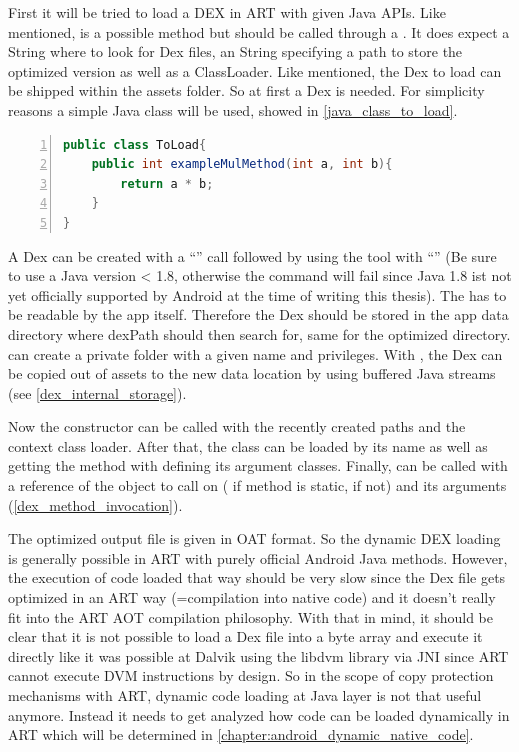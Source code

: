 First it will be tried to load a DEX in ART with given Java APIs.
Like mentioned,  is a possible method but should be called
through a . It does expect a  String where to look for Dex files, an  String specifying a path to store the optimized version as well as a  ClassLoader.
Like mentioned, the Dex to load can be shipped within the assets folder.
So at first a Dex is needed. For simplicity reasons a simple Java class will be used, showed in \autoref{java_class_to_load}.
\begin{lstlisting}[language=Java, caption=Java Class to load, label=java_class_to_load, numbers=left]
public class ToLoad{
    public int exampleMulMethod(int a, int b){
        return a * b;
    }
}
\end{lstlisting}
A Dex can be created with a ``'' call followed by
using the  tool with ``'' (Be sure to use a Java version < 1.8, otherwise the 
command will fail since Java 1.8 ist not yet officially supported by Android at the time
of writing this thesis).
The  has to be readable by the app itself. Therefore
the Dex should be stored in the app data directory where dexPath should then
search for, same for the optimized directory.
 can create a private folder with a given name
and privileges. With , the Dex can be
copied out of assets to the new data location by using buffered Java streams (see \autoref{dex_internal_storage}).

Now the  constructor can be called with the recently
created paths and the context class loader. After that, the class can be loaded
by its name as well as getting the method with defining its argument classes.
Finally,  can be called with a reference of the object to call
on ( if method is static,  if not) and its
arguments (\autoref{dex_method_invocation}).

The optimized output file is given in OAT format.
So the dynamic DEX loading is generally possible in ART with purely official
Android Java methods. However, the execution of code loaded that way should
be very slow since the Dex file gets optimized in an ART way (=compilation
into native code) and it doesn't really fit into the ART AOT compilation
philosophy. With that in mind, it should be clear that it is not possible
to load a Dex file into a byte array and execute it directly like it was
possible at Dalvik using the libdvm library via JNI since ART cannot execute
DVM instructions by design. So in the scope of copy protection mechanisms
with ART, dynamic code loading at Java layer is not that useful anymore. 
Instead it needs to get analyzed how code can be loaded dynamically in ART which 
will be determined in \autoref{chapter:android_dynamic_native_code}.

